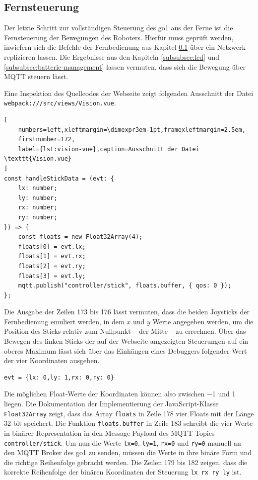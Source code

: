 \subsection{Fernsteuerung}
\label{subsec:fernsteuerung}

Der letzte Schritt zur vollständigen Steuerung des \gls{go1} aus der Ferne ist die Fernsteuerung der Bewegungen des
Roboters.
Hierfür muss geprüft werden, inwiefern sich die Befehle der Fernbedienung aus Kapitel \ref{subsec:fernsteuerung}
über ein Netzwerk replizieren lassen.
Die Ergebnisse aus den Kapiteln \ref{subsubsec:led} und \ref{subsubsec:batterie-management} lassen vermuten, dass sich
die Bewegung über MQTT steuern lässt.


Eine Inspektion des Quellcodes der Webseite zeigt folgenden Ausschnitt der Datei \texttt{webpack\allowbreak :///\allowbreak src/\allowbreak views/\allowbreak Vision.vue}.

\begin{lstlisting}[
    numbers=left,xleftmargin=\dimexpr3em-1pt,framexleftmargin=2.5em,
    firstnumber=172,
    label={lst:vision-vue},caption=Ausschnitt der Datei \texttt{Vision.vue}
]
const handleStickData = (evt: {
    lx: number;
    ly: number;
    rx: number;
    ry: number;
}) => {
    const floats = new Float32Array(4);
    floats[0] = evt.lx;
    floats[1] = evt.rx;
    floats[2] = evt.ry;
    floats[3] = evt.ly;
    mqtt.publish("controller/stick", floats.buffer, { qos: 0 });
};
\end{lstlisting}

Die Ausgabe der Zeilen \num{173} bis \num{176} lässt vermuten, dass die beiden Joysticks der Fernbedienung emuliert werden,
in dem $x$ und $y$ Werte angegeben werden, um die Position des Sticks relativ zum Nullpunkt -- der Mitte -- zu errechnen.
Über das Bewegen des linken Sticks der auf der Webseite angezeigten Steuerungen auf ein oberes Maximum lässt sich über
das Einhängen eines Debuggers folgender Wert der vier Koordinaten ausgeben.

\begin{lstlisting}
evt = {lx: 0,ly: 1,rx: 0,ry: 0}
\end{lstlisting}

\noindent Die möglichen Float-Werte der Koordinaten können also zwischen \num{-1} und \num{1} liegen.
Die Dokumentation der Implementierung der JavaScript-Klasse \texttt{Float32Array} zeigt, dass das Array \texttt{floats}
in Zeile \num{178} vier Floats mit der Länge \num{32} bit speichert.
Die Funktion \texttt{floats.buffer} in Zeile \num{183} schreibt die vier Werte in binärer Representation in den Message
Payload des MQTT Topics \texttt{controller/stick}.
Um nun die Werte \texttt{lx=0}, \texttt{ly=1}, \texttt{rx=0} und \texttt{ry=0} manuell an den MQTT Broker des \gls{go1} zu
senden, müssen die Werte in ihre binäre Form und die richtige Reihenfolge gebracht werden.
Die Zeilen \num{179} bis \num{182} zeigen, dass die korrekte Reihenfolge der binären Koordinaten der Steuerung
\texttt{lx \textrightarrow rx \textrightarrow ry \textrightarrow ly} ist.

